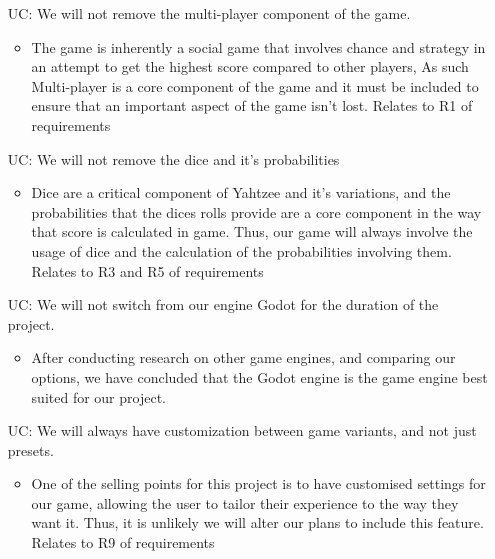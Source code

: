 \noindent \begin{itemize}

\item[UC\refstepcounter{ucnum}\theucnum \label{ULC_multiplayer}:] We will not remove the multi-player component of the game.

\begin{itemize}
	\item The game is inherently a social game that involves chance and strategy in an attempt to get the highest score compared to other players, As such Multi-player is a core component of the game and it must be included to ensure that an important aspect of the game isn't lost. Relates to R1 of requirements
\end{itemize}

	
\item[UC\refstepcounter{ucnum}\theucnum \label{ULC_dice}:] We will not remove the dice and it's probabilities 

\begin{itemize}
	\item Dice are a critical component of Yahtzee and it's variations, and the probabilities that the dices rolls provide are a core component in the way that score is calculated in game. Thus, our game will always involve the usage of dice and the calculation of the probabilities involving them. Relates to R3 and R5 of requirements
\end{itemize}


\item[UC\refstepcounter{ucnum}\theucnum \label{ULC_godot}:] We will not switch from our engine Godot for the duration of the project.

\begin{itemize}
	\item After conducting research on other game engines, and comparing our options, we have concluded that the Godot engine is the game engine best suited for our project.
\end{itemize}

\item[UC\refstepcounter{ucnum}\theucnum \label{ULC_customization}:] We will always have customization between game variants, and not just presets.


\begin{itemize}
	\item One of the selling points for this project is to have customised settings for our game, allowing the user to tailor their experience to the way they want it. Thus, it is unlikely we will alter our plans to include this feature. Relates to R9 of requirements
\end{itemize}


\end{itemize}
